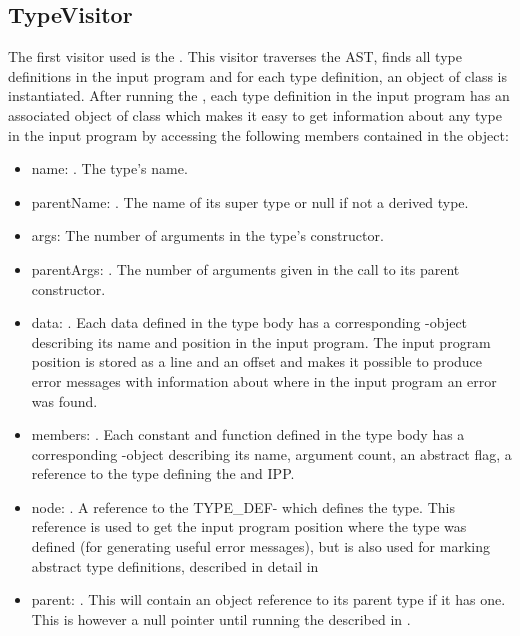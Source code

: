 \subsection{TypeVisitor}
The first visitor used is the . This visitor traverses the AST, finds all type definitions in the input program and for each type definition, an object of class  is instantiated. After running the , each type definition in the input program has an associated object of class  which makes it easy to get information about any type in the input program by accessing the following members contained in the  object:
\begin{itemize}
\item name: . The type's name.
\item parentName: . The name of its super type or null if not a derived type.
\item args:  The number of arguments in the type's constructor.
\item parentArgs: .  The number of arguments given in the call to its parent constructor.
\item data: . Each data defined in the type body has a corresponding -object describing its name and position in the input program. The input program position is stored as a line and an offset and makes it possible to produce error messages with information about where in the input program an error was found.
\item members: . Each constant and function defined in the type body has a corresponding -object describing its name, argument count, an abstract flag, a  reference to the type defining the  and IPP.
\item node: . A reference to the TYPE\_DEF- which defines the type. This reference is used to get the input program position where the type was defined (for generating useful error messages), but is also used for marking abstract type definitions, described in detail in   
\item parent: . This will contain an object reference to its parent type if it has one. This is however a null pointer until running the  described in .
\end{itemize}

